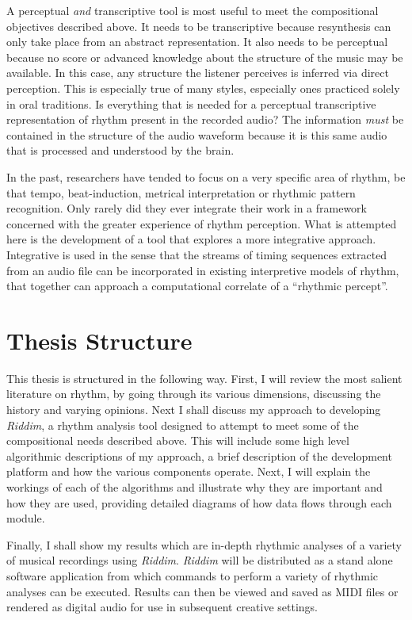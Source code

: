 A perceptual {\sl and} transcriptive tool is most useful to meet the 
compositional objectives described above.  It needs to be
transcriptive because resynthesis can only take place from an abstract
representation. It also needs to be perceptual because no score or
advanced knowledge about the structure of the music may be available.
In this case, any structure the listener perceives is inferred
via direct perception.  This is especially true of many styles,
especially ones practiced solely in oral traditions. 
Is everything that is needed for a perceptual transcriptive
representation of rhythm present in the recorded audio?  The
information {\sl must} be contained in the structure of the audio
waveform because it is this same audio that is processed 
and understood by the brain. 

In the past, researchers have tended to focus on a very specific area 
of rhythm, be that tempo, beat-induction, metrical interpretation or 
rhythmic pattern recognition. Only rarely did they ever integrate 
their work in a framework concerned with the greater experience of 
rhythm perception.  What is attempted here is the development of a 
tool that explores a more integrative approach. Integrative is used 
in the sense that the streams of timing sequences extracted from an audio 
file can be incorporated in existing interpretive models of rhythm, 
that together can approach a computational correlate of a ``rhythmic percept''.

\vspace{7mm}
\section{Thesis Structure}
\vspace{3mm}

This thesis is structured in the following way. First, I will review the
most salient literature on rhythm, by going through its various dimensions, 
discussing the history and varying opinions. Next I shall discuss my 
approach to developing {\it Riddim}, a rhythm analysis tool designed 
to attempt to meet some of the compositional needs described above.  
This will include some high level algorithmic descriptions of my approach, 
a brief description of the development platform and how the various 
components operate.  Next, I will explain the workings of each of the 
algorithms and illustrate why they are important and how they are 
used, providing detailed diagrams of how data flows through each module.

Finally, I shall show my results which are in-depth rhythmic analyses 
of a variety of musical recordings using {\it Riddim}. {\it Riddim} will
be distributed as a stand alone software application from which commands to
perform a variety of rhythmic analyses can be executed. Results can then
be viewed and saved as MIDI files or rendered as digital audio for use
in subsequent creative settings. 

